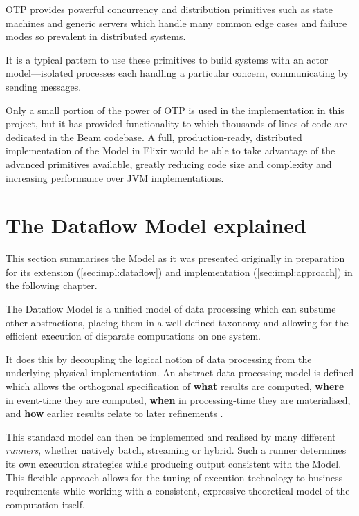 OTP provides powerful concurrency and distribution primitives such as state machines and generic servers which handle many common edge cases and failure modes so prevalent in distributed systems.

It is a typical pattern to use these primitives to build systems with an actor model---isolated processes each handling a particular concern, communicating by sending messages.

Only a small portion of the power of OTP is used in the implementation in this project, but it has provided functionality to which thousands of lines of code are dedicated in the Beam codebase.
A full, production-ready, distributed implementation of the Model in Elixir would be able to take advantage of the advanced primitives available, greatly reducing code size and complexity and increasing performance over JVM implementations.

\section{The Dataflow Model explained}\label{sec:prep:dataflow}

This section summarises the Model as it was presented originally \cite{Akidau:2015} in preparation for its extension (\cref{sec:impl:dataflow}) and implementation (\cref{sec:impl:approach}) in the following chapter.

The Dataflow Model is a unified model of data processing which can subsume other abstractions, placing them in a well-defined taxonomy and allowing for the efficient execution of disparate computations on one system.

It does this by decoupling the logical notion of data processing from the underlying physical implementation.
An abstract data processing model is defined which allows the orthogonal specification of \textbf{what} results are computed, \textbf{where} in event-time they are computed, \textbf{when} in processing-time they are materialised, and \textbf{how} earlier results relate to later refinements \cite[p.~1793]{Akidau:2015}.

This standard model can then be implemented and realised by many different \emph{runners}, whether natively batch, streaming or hybrid. 
Such a runner determines its own execution strategies while producing output consistent with the Model.
This flexible approach allows for the tuning of execution technology to business requirements while working with a consistent, expressive theoretical model of the computation itself.

